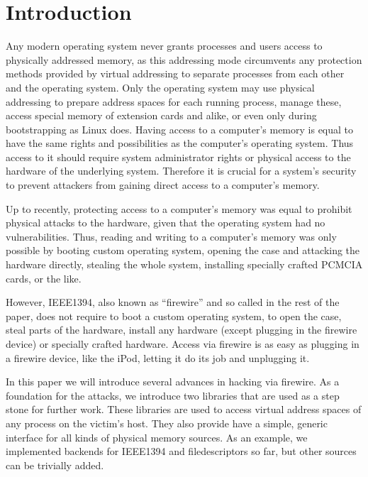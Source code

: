 %
%

\section{Introduction}

Any modern operating system never grants processes and users access to
physically addressed memory, as this addressing mode circumvents any protection
methods provided by virtual addressing to separate processes from each other and
the operating system. Only the operating system may use physical addressing to
prepare address spaces for each running process, manage these, access special
memory of extension cards and alike, or even only during bootstrapping as Linux
does. Having access to a computer's memory is equal to have the same rights and
possibilities as the computer's operating system. Thus access to it should
require system administrator rights or physical access to the hardware of the
underlying system.  Therefore it is crucial for a system's security to prevent
attackers from gaining direct access to a computer's memory.

Up to recently, protecting access to a computer's memory was equal to prohibit
physical attacks to the hardware, given that the operating system had no
vulnerabilities. Thus, reading and writing to a computer's memory was only
possible by booting custom operating system, opening the case and attacking the
hardware directly, stealing the whole system, installing specially crafted
PCMCIA cards, or the like.  

However, IEEE1394, also known as ``firewire'' and so called in the rest of the
paper, does not require to boot a custom operating system, to open the case,
steal parts of the hardware, install any hardware (except plugging in the
firewire device) or specially crafted hardware.  Access via firewire is as easy
as plugging in a firewire device, like the iPod, letting it do its job and
unplugging it.

In this paper we will introduce several advances in hacking via firewire. As a
foundation for the attacks, we introduce two libraries that are used as a step
stone for further work. These libraries are used to access virtual address
spaces of any process on the victim's host. They also provide have a simple,
generic interface for all kinds of physical memory sources. As an example, we
implemented backends for IEEE1394 and filedescriptors so far, but other sources
can be trivially added.

